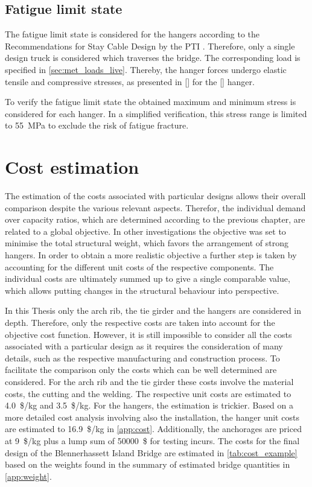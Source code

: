\subsection{Fatigue limit state}\label{sec:fatigue}
The fatigue limit state is considered for the hangers according to the Recommendations for Stay Cable Design by the PTI \cite{PTI}. Therefore, only a single design truck is considered which traverses the bridge. The corresponding load is specified in \cref{sec:met_loads_live}. Thereby, the hanger forces undergo elastic tensile and compressive stresses, as presented in [] for the [] hanger. 

To verify the fatigue limit state the obtained maximum and minimum stress is considered for each hanger. In a simplified verification, this stress range is limited to \SI{55}{MPa} to exclude the risk of fatigue fracture.

\section{Cost estimation} \label{sec:met_cost}
The estimation of the costs associated with particular designs allows their overall comparison despite the various relevant aspects. Therefor, the individual demand over capacity ratios, which are determined according to the previous chapter, are related to a global objective. In other investigations the objective was set to minimise the total structural weight, which favors the arrangement of strong hangers. In order to obtain a more realistic objective a further step is taken by accounting for the different unit costs of the respective components. The individual costs are ultimately summed up to give a single comparable value, which allows putting changes in the structural behaviour into perspective. \medskip

In this Thesis only the arch rib, the tie girder and the hangers are considered in depth. Therefore, only the respective costs are taken into account for the objective cost function. However, it is still impossible to consider all the costs associated with a particular design as it requires the consideration of many details, such as the respective manufacturing and construction process. To facilitate the comparison only the costs which can be well determined are considered. For the arch rib and the tie girder these costs involve the material costs, the cutting and the welding. The respective unit costs are estimated to \SI{4.0}{\$/kg} and \SI{3.5}{\$/kg}. For the hangers, the estimation is trickier. Based on a more detailed cost analysis involving also the installation, the hanger unit costs are estimated to \SI{16.9}{\$/kg} in \cref{app:cost}. Additionally, the anchorages are priced at \SI{9}{\$/kg} plus a lump sum of \SI{50000}{\$} for testing incurs. The costs for the final design of the Blennerhassett Island Bridge are estimated in \cref{tab:cost_example} based on the weights found in the summary of estimated bridge quantities in \cref{app:weight}.

